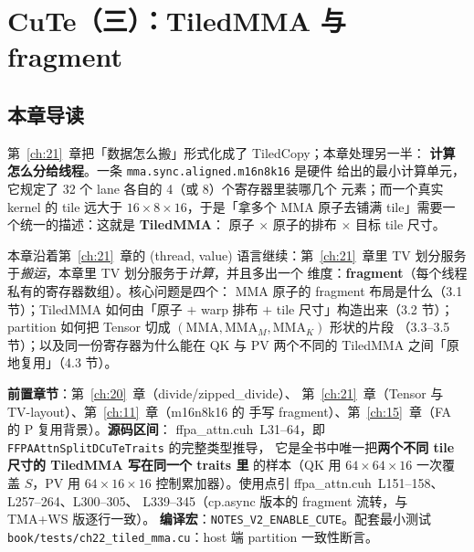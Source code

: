 \makeatletter
\providecommand{\urlchbrk}[1]{\@tfor\next:=#1\do{\next\allowbreak}}
\makeatother
\providecommand{\url}[1]{{\ttfamily\urlchbrk{#1}}}
\chapter{CuTe（三）：TiledMMA 与 fragment}\label{ch:22}

\section{本章导读}

第~\ref{ch:21}~章把「数据怎么搬」形式化成了 TiledCopy；本章处理另一半：
\textbf{计算怎么分给线程}。一条 \texttt{mma.\allowbreak{}sync.\allowbreak{}aligned.\allowbreak{}m16n8k16} 是硬件
给出的最小计算单元，它规定了 32 个 lane 各自的 4（或 8）个寄存器里装哪几个
元素；而一个真实 kernel 的 tile 远大于 $16\times8\times16$，于是「拿多个
MMA 原子去铺满 tile」需要一个统一的描述：这就是 \textbf{TiledMMA}：
原子 $\times$ 原子的排布 $\times$ 目标 tile 尺寸。

本章沿着第~\ref{ch:21}~章的 (thread, value) 语言继续：第~\ref{ch:21}~章里
TV 划分服务于\emph{搬运}，本章里 TV 划分服务于\emph{计算}，并且多出一个
维度：\textbf{fragment}（每个线程私有的寄存器数组）。核心问题是四个：
MMA 原子的 fragment 布局是什么（3.1 节）；TiledMMA 如何由「原子 $+$ warp
排布 $+$ tile 尺寸」构造出来（3.2 节）；partition 如何把 Tensor 切成
$(\mathrm{MMA}, \mathrm{MMA}_M, \mathrm{MMA}_K)$ 形状的片段
（3.3--3.5 节）；以及同一份寄存器为什么能在 QK 与 PV 两个不同的
TiledMMA 之间「原地复用」（4.3 节）。

\textbf{前置章节}：第~\ref{ch:20}~章（divide/zipped\_divide）、
第~\ref{ch:21}~章（Tensor 与 TV-layout）、第~\ref{ch:11}~章（m16n8k16 的
手写 fragment）、第~\ref{ch:15}~章（FA 的 P 复用背景）。\textbf{源码区间}：
ffpa\_attn.cuh~L31--64，即 \texttt{FFPAAttn\allowbreak{}Split\allowbreak{}DCu\allowbreak{}Te\allowbreak{}Traits} 的完整类型推导，
它是全书中唯一把\textbf{两个不同 tile 尺寸的 TiledMMA 写在同一个 traits 里}
的样本（QK 用 $64\times64\times16$ 一次覆盖 $S$，PV 用 $64\times16\times16$
控制累加器）。使用点引 ffpa\_attn.cuh~L151--158、L257--264、L300--305、
L339--345（cp.async 版本的 fragment 流转，与 TMA+WS 版逐行一致）。
\textbf{编译宏}：\texttt{NOTES\_\allowbreak{}V2\_\allowbreak{}ENABLE\_\allowbreak{}CUTE}。配套最小测试
\texttt{book/\allowbreak{}tests/\allowbreak{}ch22\_\allowbreak{}tiled\_\allowbreak{}mma.cu}：host 端 partition 一致性断言。

